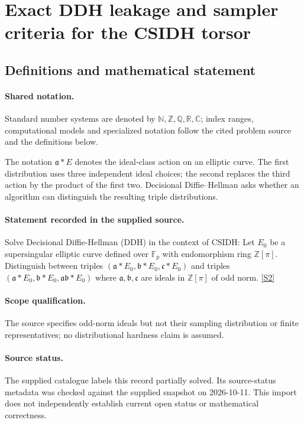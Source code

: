 \documentclass[11pt]{article}
\newcommand{\sref}[2]{\hyperlink{source:#1:#2}{[S#2]}}
\begin{document}
\section{Exact DDH leakage and sampler criteria for the CSIDH torsor}\label{statement}

\subsection{Definitions and mathematical statement}

\paragraph{Shared notation.}Standard number systems are denoted by $\mathbb N,\mathbb Z,\mathbb Q,\mathbb R,\mathbb C$; index ranges, computational models and specialized notation follow the cited problem source and the definitions below.


The notation $\mathfrak a*E$ denotes the ideal-class action on an elliptic curve. The first distribution uses three independent ideal choices; the second replaces the third action by the product of the first two. Decisional Diffie--Hellman asks whether an algorithm can distinguish the resulting triple distributions.
\paragraph{Statement recorded in the supplied source.}
Solve Decisional Diffie-Hellman (DDH) in the context of CSIDH: Let $E_0$ be a supersingular elliptic curve defined over $\mathbb F_p$ with endomorphism ring $\mathbb Z[\pi]$. Distinguish between triples $(\mathfrak a * E_0, \mathfrak b* E_0,\mathfrak c* E_0)$ and triples $(\mathfrak a * E_0, \mathfrak b* E_0,\mathfrak a\mathfrak b * E_0)$ where $\mathfrak a, \mathfrak b, \mathfrak c$ are ideals in $\mathbb Z[\pi]$ of odd norm. \sref{statement}{2}
\paragraph{Scope qualification.}
The source specifies odd-norm ideals but not their sampling distribution or finite representatives; no distributional hardness claim is assumed.
\paragraph{Source status.}
The supplied catalogue labels this record partially solved. Its source-status metadata was checked against the supplied snapshot on 2026-10-11. This import does not independently establish current open status or mathematical correctness.
\end{document}
